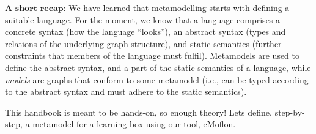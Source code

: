 \vspace{0.5cm}

$\textbf{A short recap:}$ We have learned that metamodelling starts with defining a suitable language. For the moment, we know that a language comprises a
concrete syntax (how the language ``looks''),  an abstract syntax (types and relations of the underlying graph structure), and static semantics (further
constraints that members of the language must fulfil). Metamodels are used to define the abstract syntax, and a part of the static semantics of a language,
while \emph{models} are graphs that conform to some metamodel (i.e., can be typed according to the abstract syntax and must adhere to the static
semantics).

\vspace{0.5cm}

This handbook is meant to be hands-on, so enough theory! Lets define, step-by-step, a metamodel for a learning box using our tool, eMoflon.

